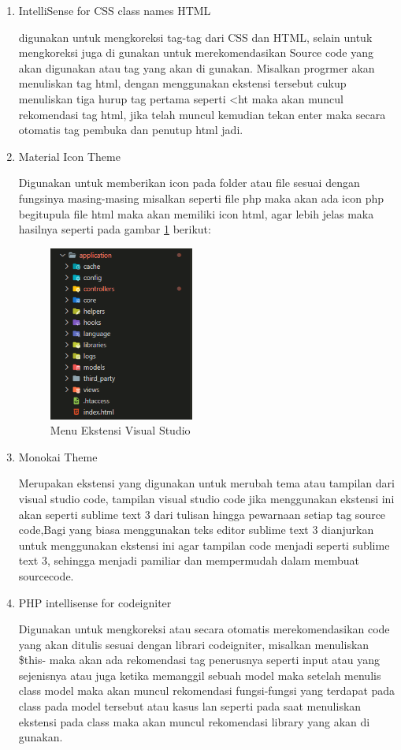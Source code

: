 \begin{enumerate}
\item IntelliSense for CSS class names HTML\par
digunakan untuk mengkoreksi tag-tag dari CSS dan HTML, selain untuk mengkoreksi juga di gunakan untuk merekomendasikan Source code yang akan digunakan atau tag yang akan di gunakan. Misalkan progrmer akan menuliskan tag html, dengan menggunakan ekstensi tersebut cukup menuliskan tiga hurup tag pertama seperti <ht maka akan muncul rekomendasi tag html, jika telah muncul kemudian tekan enter maka secara otomatis tag pembuka dan penutup html jadi.
\item Material Icon Theme\par
Digunakan untuk memberikan icon pada folder atau file sesuai dengan fungsinya masing-masing misalkan seperti file php maka akan ada icon php begitupula file html maka akan memiliki icon html, agar lebih jelas maka hasilnya seperti pada gambar \ref{V18} berikut:
\begin{figure}[!htbp]
	\centerline{\includegraphics[width=0.45\textwidth]{figures/vs/18.png}}
	\caption{Menu Ekstensi Visual Studio}
	\label{V18}
\end{figure}
\item Monokai Theme\par
Merupakan ekstensi yang digunakan untuk merubah tema atau tampilan dari visual studio code, tampilan visual studio code jika menggunakan ekstensi ini akan seperti sublime text 3 dari tulisan hingga pewarnaan setiap tag source code,Bagi yang biasa menggunakan teks editor sublime text 3 dianjurkan untuk menggunakan ekstensi ini agar tampilan code menjadi seperti sublime text 3, sehingga menjadi pamiliar dan mempermudah dalam membuat sourcecode.

\pagebreak
\item PHP intellisense for codeigniter\par
Digunakan untuk mengkoreksi atau secara otomatis merekomendasikan code yang akan ditulis sesuai dengan librari codeigniter, misalkan menuliskan \$this-  maka akan ada rekomendasi tag penerusnya seperti input atau yang sejenisnya atau juga ketika memanggil sebuah model maka setelah menulis class model maka akan muncul rekomendasi fungsi-fungsi yang terdapat pada class pada model tersebut atau kasus lan seperti pada saat menuliskan ekstensi pada class maka akan muncul rekomendasi library yang akan di gunakan.\par



\end{enumerate}
